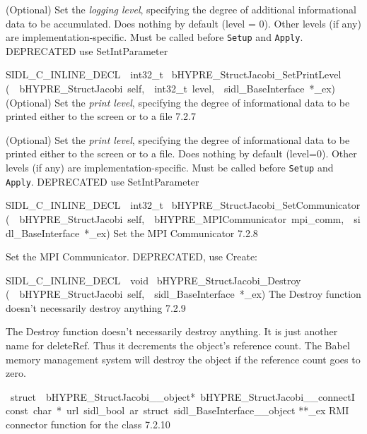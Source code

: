 \documentclass{article}
\begin{document}
\begin{cxxentry}
\begin{cxxentry}
\begin{cxxfunction}
\begin{cxxdoc}
(Optional) Set the {\it logging level}, specifying the degree
of additional informational data to be accumulated.  Does
nothing by default (level = 0).  Other levels (if any) are
implementation-specific.  Must be called before {\tt Setup}
and {\tt Apply}.
DEPRECATED   use SetIntParameter
\end{cxxdoc}
\end{cxxfunction}
\begin{cxxfunction}
{SIDL\_C\_INLINE\_DECL\ \ int32\_t\ }
        {bHYPRE\_StructJacobi\_SetPrintLevel}
        {(\ \ bHYPRE\_StructJacobi\ self,\ \ int32\_t\ level,\ \ sidl\_BaseInterface\ *\_ex)}
        {
(Optional) Set the {\it print level}, specifying the degree
of informational data to be printed either to the screen or
to a file}
        {7.2.7}
\begin{cxxdoc}

(Optional) Set the {\it print level}, specifying the degree
of informational data to be printed either to the screen or
to a file.  Does nothing by default (level=0).  Other levels
(if any) are implementation-specific.  Must be called before
{\tt Setup} and {\tt Apply}.
DEPRECATED   use SetIntParameter
\end{cxxdoc}
\end{cxxfunction}
\begin{cxxfunction}
{SIDL\_C\_INLINE\_DECL\ \ int32\_t\ }
        {bHYPRE\_StructJacobi\_SetCommunicator}
        {(\ \ bHYPRE\_StructJacobi\ self,\ \ bHYPRE\_MPICommunicator\ mpi\_comm,\ \ sidl\_BaseInterface\ *\_ex)}
        {
Set the MPI Communicator}
        {7.2.8}
\begin{cxxdoc}

Set the MPI Communicator.
DEPRECATED, use Create:
\end{cxxdoc}
\end{cxxfunction}
\begin{cxxfunction}
{SIDL\_C\_INLINE\_DECL\ \ void\ }
        {bHYPRE\_StructJacobi\_Destroy}
        {(\ \ bHYPRE\_StructJacobi\ self,\ \ sidl\_BaseInterface\ *\_ex)}
        {
The Destroy function doesn't necessarily destroy anything}
        {7.2.9}
\begin{cxxdoc}

The Destroy function doesn't necessarily destroy anything.
It is just another name for deleteRef.  Thus it decrements the
object's reference count.  The Babel memory management system will
destroy the object if the reference count goes to zero.
\end{cxxdoc}
\end{cxxfunction}
\begin{cxxvariable}
{\ struct\ \ bHYPRE\_StructJacobi\_\_object*\ bHYPRE\_StructJacobi\_\_connectI\ const\ char\ *\ url\ sidl\_bool\ ar\ struct\ sidl\_BaseInterface\_\_object}
        {**\_ex}
        {}
        {
RMI connector function for the class}
        {7.2.10}
\begin{cxxdoc}


\end{cxxdoc}
\end{cxxvariable}
\end{cxxentry}
\end{cxxentry}
\end{document}
